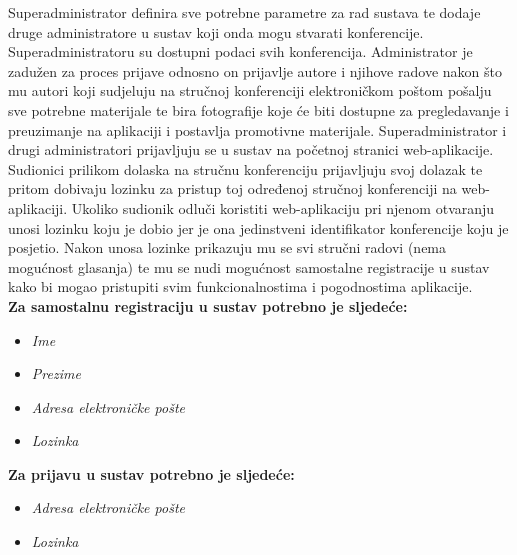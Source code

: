 		Superadministrator definira sve potrebne parametre za rad sustava te dodaje druge administratore u sustav koji onda mogu stvarati konferencije. Superadministratoru su dostupni podaci svih konferencija. Administrator je zadužen za proces prijave odnosno on prijavlje autore i njihove radove nakon što mu autori koji sudjeluju na stručnoj konferenciji elektroničkom poštom pošalju sve potrebne materijale te bira fotografije koje će biti dostupne za pregledavanje i preuzimanje na aplikaciji i postavlja promotivne materijale. Superadministrator i drugi administratori prijavljuju se u sustav na početnoj stranici web-aplikacije.\\
		
		Sudionici prilikom dolaska na stručnu konferenciju prijavljuju svoj dolazak te pritom dobivaju lozinku za pristup toj određenoj stručnoj konferenciji na web-aplikaciji. Ukoliko sudionik odluči koristiti web-aplikaciju pri njenom otvaranju unosi lozinku koju je dobio jer je ona jedinstveni identifikator konferencije koju je posjetio. Nakon unosa lozinke prikazuju mu se svi stručni radovi (nema mogućnost glasanja) te mu se nudi mogućnost samostalne registracije u sustav kako bi mogao pristupiti svim funkcionalnostima i pogodnostima aplikacije.\\

        \textbf{Za samostalnu registraciju u sustav potrebno je sljedeće:}
        \begin{itemize}
        	\item \textit{Ime}
        	\item \textit{Prezime}
        	\item \textit{Adresa elektroničke pošte}
        	\item \textit{Lozinka}
        \end{itemize}

		\textbf{Za prijavu u sustav potrebno je sljedeće:}
        \begin{itemize}
            \item \textit{Adresa elektroničke pošte}
            \item \textit{Lozinka}
        \end{itemize}
        

